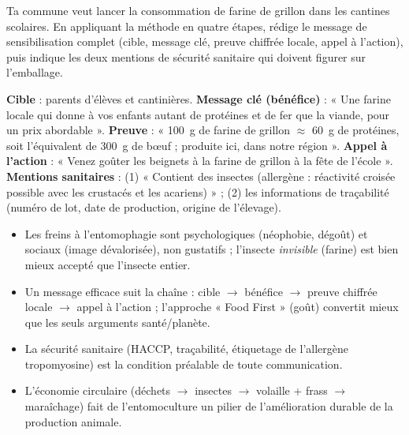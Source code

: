 \documentclass[11pt]{article}
\begin{document}
\begin{exercice}
Ta commune veut lancer la consommation de farine de grillon dans les cantines scolaires. En appliquant la méthode en quatre étapes, rédige le message de sensibilisation complet (cible, message clé, preuve chiffrée locale, appel à l'action), puis indique les deux mentions de sécurité sanitaire qui doivent figurer sur l'emballage.
\end{exercice}

\begin{corrige}[Exercice]
\textbf{Cible} : parents d'élèves et cantinières. \textbf{Message clé (bénéfice)} : « Une farine locale qui donne à vos enfants autant de protéines et de fer que la viande, pour un prix abordable ». \textbf{Preuve} : « \SI{100}{\gram} de farine de grillon $\approx$ \SI{60}{\gram} de protéines, soit l'équivalent de \SI{300}{\gram} de bœuf ; produite ici, dans notre région ». \textbf{Appel à l'action} : « Venez goûter les beignets à la farine de grillon à la fête de l'école ». \textbf{Mentions sanitaires} : (1) « Contient des insectes (allergène : réactivité croisée possible avec les crustacés et les acariens) » ; (2) les informations de traçabilité (numéro de lot, date de production, origine de l'élevage).
\end{corrige}

\begin{aretenir}
\begin{itemize}
\item Les freins à l'entomophagie sont psychologiques (néophobie, dégoût) et sociaux (image dévalorisée), non gustatifs ; l'insecte \emph{invisible} (farine) est bien mieux accepté que l'insecte entier.
\item Un message efficace suit la chaîne : cible $\rightarrow$ bénéfice $\rightarrow$ preuve chiffrée locale $\rightarrow$ appel à l'action ; l'approche « Food First » (goût) convertit mieux que les seuls arguments santé/planète.
\item La sécurité sanitaire (HACCP, traçabilité, étiquetage de l'allergène tropomyosine) est la condition préalable de toute communication.
\item L'économie circulaire (déchets $\rightarrow$ insectes $\rightarrow$ volaille + frass $\rightarrow$ maraîchage) fait de l'entomoculture un pilier de l'amélioration durable de la production animale.
\end{itemize}
\end{aretenir}
\end{document}
